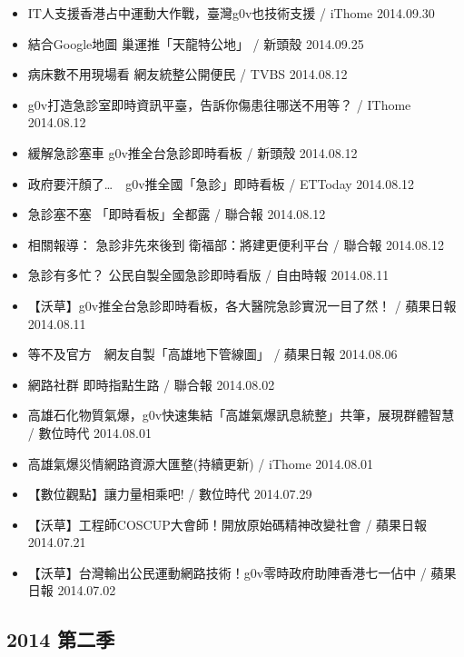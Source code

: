 \begin{itemize}
\item IT人支援香港占中運動大作戰，臺灣g0v也技術支援 / iThome 2014.09.30
\item 結合Google地圖 巢運推「天龍特公地」 / 新頭殼 2014.09.25
\item 病床數不用現場看 網友統整公開便民 / TVBS 2014.08.12
\item g0v打造急診室即時資訊平臺，告訴你傷患往哪送不用等？ / IThome 2014.08.12
\item 緩解急診塞車 g0v推全台急診即時看板 / 新頭殼 2014.08.12
\item 政府要汗顏了…　g0v推全國「急診」即時看板 / ETToday 2014.08.12
\item 急診塞不塞 「即時看板」全都露 / 聯合報 2014.08.12
\item 相關報導： 急診非先來後到 衛福部：將建更便利平台 / 聯合報 2014.08.12
\item 急診有多忙？ 公民自製全國急診即時看版 / 自由時報 2014.08.11
\item 【沃草】g0v推全台急診即時看板，各大醫院急診實況一目了然！ / 蘋果日報 2014.08.11
\item 等不及官方　網友自製「高雄地下管線圖」 / 蘋果日報 2014.08.06
\item 網路社群 即時指點生路 / 聯合報 2014.08.02
\item 高雄石化物質氣爆，g0v快速集結「高雄氣爆訊息統整」共筆，展現群體智慧 / 數位時代 2014.08.01
\item 高雄氣爆災情網路資源大匯整(持續更新) / iThome 2014.08.01
\item 【數位觀點】讓力量相乘吧! / 數位時代 2014.07.29
\item 【沃草】工程師COSCUP大會師！開放原始碼精神改變社會 / 蘋果日報 2014.07.21
\item 【沃草】台灣輸出公民運動網路技術！g0v零時政府助陣香港七一佔中 / 蘋果日報 2014.07.02
\end{itemize}

\subsection{2014 第二季}

